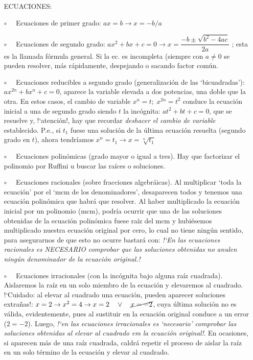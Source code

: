 ECUACIONES:

$\circ \quad$ Ecuaciones de primer grado: $ax=b \to x=-b/a$

$\circ \quad$ Ecuaciones de segundo grado: $a x^2 + b x +c =0 \to x =\dfrac {-b \pm \sqrt{b^2 - 4ac}}  {2a}$ ; esta es la llamada fórmula general. Si la ec. es incompleta (siempre con $a \neq 0$ se pueden resolver, más rápidamente, despejando o sacando factor común.

$\circ \quad$ Ecuaciones reducibles a segundo grado (generalización de las `bicuadradas'): $a x^{2n} + b x^n + c = 0$, aparece la variable elevada a dos potencias, una doble que la otra. En estos casos, el cambio de variable $x^n=t; \; x^{2n}=t^2$ conduce la ecuación inicial a una de segundo grado siendo $t$ la incógnita: $a t^2 + b t+ c =0$, que se resuelve y, !`atención!, hay que recordar \emph{deshacer el cambio de variable} establecido. P.e., si $t_1$ fuese una solución de la última ecuación resuelta (segundo grado en $t$), ahora tendríamos $x^n=t_1 \to x=\sqrt[n]{t_1}$

 $\circ \quad$ Ecuaciones polinómicas (grado mayor o igual a tres). Hay que factorizar el polinomio por Ruffini u buscar las raíces o soluciones. 

$\circ \quad$ Ecuaciones racionales (sobre fracciones algebráicas). Al multiplicar `toda la ecuación' por el `mcm de los denominadores', desaparecen todos y tenemos una ecuación polinómica que habrá que resolver. Al haber multiplicado la ecuación inicial por un polinomio (mcm),  podría ocurrir que una de las soluciones obtenidas de la ecuación polinómica fuese raíz del mcm y hubiésemos multiplicado nuestra ecuación original por cero, lo cual no tiene ningún sentido, para asegurarnos de que esto no ocurre bastará con: \emph{!`En las ecuaciones racionales es NECESARIO comprobar que las soluciones obtenidas no anulen ningún denominador de la ecuación original.!}

$\circ \quad$ Ecuaciones irracionales (con la incógnita bajo alguna raíz cuadrada). Aislaremos la raíz en un solo miembro de la ecuación y elevaremos al cuadrado. !`Cuidado: al elevar al cuadrado una ecuación, pueden aparecer soluciones extrañas!: $x=2 \to x^2=4 \to x=2 \quad \vee \quad \cancel{x=-2}$, cuya última solución no es válida, evidentemente, pues al sustituir en la ecuación original conduce a un error ($2=-2$). Luego, \emph{!`en las ecuaciones irracionales es `necesario' comprobar las soluciones obtenidas al elevar al cuadrado em la ecuación original!}. En ocasiones, si aparecen más de una raíz cuadrada, caldrá repetir el proceso de aislar la raíz en un solo término de la ecuación y elevar al cuadrado.

